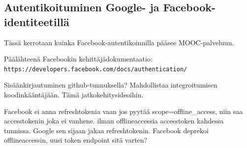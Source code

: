 \documentclass[finnish,gradu]{tktltiki}
\begin{document}



  \subsection{Autentikoituminen Google- ja Facebook-identiteetillä} %
  \label{sub:autentikoituminen_facebook}
  Tässä kerrotaan kuinka Facebook-autentikoinnilla pääsee MOOC-palveluun.

  Päälähteenä Facebookin kehittäjädokumentaatio:
  \\ \verb!https://developers.facebook.com/docs/authentication/!

  Sisäänkirjautuminen github-tunnuksella? Mahdollistaa integroitumisen koodinkääntäjään. Tämä jatkokehitysideoihin.

  Facebook ei anna refreshtokenia vaan jos pyytää scope=offline\_access, niin saa accesstokenin joka ei vanhene. ilman offlineaccessia accesstoken kahdessa tunnissa. Google sen sijaan jakaa refreshtokenin.
  Facebook deprekoi offlineaccessin, uusi token endpoint sitä varten?
\end{document}

